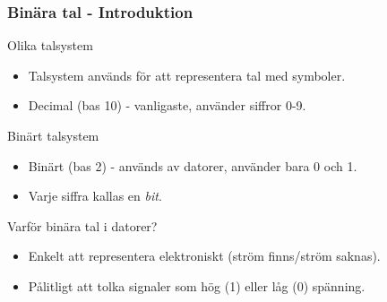 \begin{frame}[fragile=singleslide]
\begin{columns}[T]
\begin{column}{0.4\textwidth}
\begin{center}
            \end{center}
        \end{column}
    \end{columns}
    
\end{frame}

\begin{frame}[fragile=singleslide]
    \frametitle{Binära tal - Introduktion}
    \begin{block}{Olika talsystem}
        \begin{itemize}
            \item Talsystem används för att representera tal med symboler.
            \item Decimal (bas 10) - vanligaste, använder siffror 0-9.
        \end{itemize}
    \end{block}
    \begin{block}{Binärt talsystem}
        \begin{itemize}
            \item Binärt (bas 2) - används av datorer, använder bara 0 och 1.
            \item Varje siffra kallas en \textit{bit}.
        \end{itemize}
    \end{block}
    \begin{block}{Varför binära tal i datorer?}
        \begin{itemize}
            \item Enkelt att representera elektroniskt (ström finns/ström saknas).
            \item Pålitligt att tolka signaler som hög (1) eller låg (0) spänning.
        \end{itemize}
    \end{block}
\end{frame}

